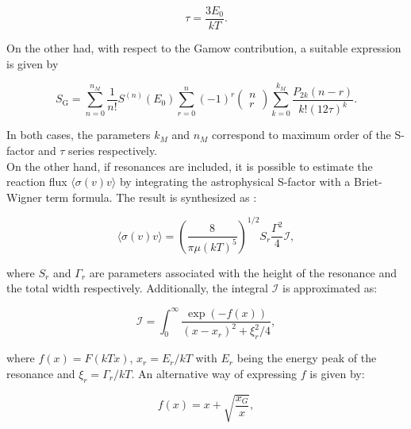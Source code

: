 \documentclass[openany]{book}
\begin{document}
\begin{equation}\label{eq:sfactor_nonResonant_tau}
	\tau = \frac{3E_0}{kT}.
\end{equation}

On the other had, with respect to the Gamow contribution, a suitable expression is given by 

\begin{equation}\label{eq:sfactor_nonResonant_Gamow}
	S_{\mathrm{G}}  = \sum_{n = 0} ^{n_M} {\frac{1}{n!} S^{(n)}(E_0)\sum_{r=0}^{n}(-1)^{r} \left (\begin{matrix}
			n \\
			r
	\end{matrix} \right) \sum_{k=0}^{k_M} {\frac{P_{2k}(n-r)}{k! (12\tau)^k }} }.
\end{equation}

In both cases, the parameters $k_M$ and $n_M$ correspond to maximum order of the S-factor and $\tau$ series respectively. \\


On the other hand, if resonances are included, it is possible to estimate the reaction flux $\langle \sigma (v) v \rangle$ by integrating the astrophysical S-factor with a Briet-Wigner term formula. The result is synthesized as \cite{ueda_sargeant_pato_hussein_2004}: 

 \begin{equation}\label{eq:sfactor_rate_resonant}
 	\langle \sigma (v) v \rangle= \left ( \frac{8}{\pi \mu (kT)^5} \right)^{1/2} S_r \frac{\Gamma^2}{4} \mathcal{I},
 \end{equation}

where $S_r$ and $\Gamma_r$ are parameters associated with the height of the resonance and the total width respectively. Additionally, the integral $\mathcal{I}$ is approximated as: 

 \begin{equation}\label{eq:sfactor_rate_resonant_integral}
	 \mathcal{I} = \int_{0}^{\infty} {\frac{\exp{(-f(x))}}{(x-x_r)^2 + \xi^2_r/4}}, 
\end{equation}

where $f(x) = F(kTx)$, $x_r = E_r/kT$ with $E_r$ being the energy peak of the resonance and $\xi_r = \Gamma_r/kT$. An alternative way of expressing $f$ is given by:

\begin{equation}\label{eq:sfactor_rate_resonant_f}
	f(x) = x + \sqrt{\frac{x_G}{x}}, 
\end{equation}
\end{document}
